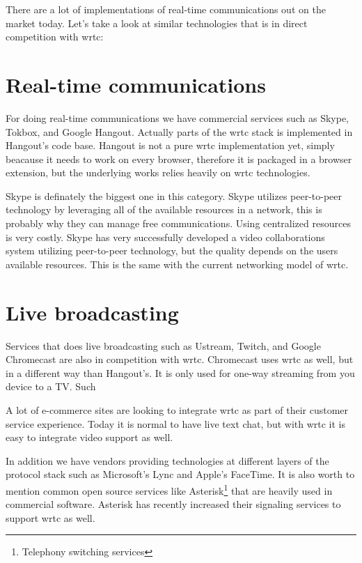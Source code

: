 
There are a lot of implementations of real-time communications out on the market today. Let's take a look at similar technologies\cite{lopez_fernandez_catalysing_2013} that is in direct competition with \gls{wrtc}:

\section{Real-time communications}
For doing real-time communications we have commercial services such as Skype, Tokbox, and Google Hangout. Actually parts of the \gls{wrtc} stack is implemented in Hangout's code base. Hangout is not a pure \gls{wrtc} implementation yet, simply beacause it needs to work on every browser, therefore it is packaged in a browser extension, but the underlying works relies heavily on \gls{wrtc} technologies.

Skype is definately the biggest one in this category. Skype utilizes peer-to-peer technology by leveraging all of the available resources in a network, this is probably why they can manage free communications. Using centralized resources is very costly. Skype has very successfully developed a video collaborations system utilizing peer-to-peer technology, but the quality depends on the users available resources. This is the same with the current networking model of \gls{wrtc}.

\section{Live broadcasting}
Services that does live broadcasting such as Ustream, Twitch, and Google Chromecast are also in competition with \gls{wrtc}. Chromecast uses \gls{wrtc} as well, but in a different way than Hangout's. It is only used for one-way streaming from you device to a TV. Such 

A lot of e-commerce sites are looking to integrate \gls{wrtc} as part of their customer service experience. Today it is normal to have live text chat, but with \gls{wrtc} it is easy to integrate video support as well.

In addition we have vendors providing technologies at different layers of the protocol stack such as Microsoft's Lync and Apple's FaceTime. It is also worth to mention common open source services like Asterisk\footnote{Telephony switching services} that are heavily used in commercial software. Asterisk has recently increased their signaling services to support \gls{wrtc} as well.

